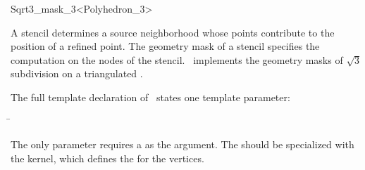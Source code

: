 \ccRefPageEnd


\begin{ccRefClass}{Sqrt3_mask_3<Polyhedron_3>}

\ccDefinition

A stencil determines a source neighborhood 
whose points contribute to the position of a refined point.
The geometry mask of a stencil specifies
the computation on the nodes of the stencil.
\ccClassTemplateName\ implements the geometry masks of 
$\sqrt{3}$ subdivision on a triangulated 
.


\ccParameters

The full template declaration of \ccClassTemplateName\ states one
template parameter:

\begin{tabbing}
 \= 
\end{tabbing}
   
The only parameter requires a  as the argument. The
 should be specialized with the 
kernel, which defines the  for the vertices.

\ccCreation
{}


\ccThreeToTwo



\ccSeeAlso

\\

\end{ccRefClass}

\ccRefPageEnd

